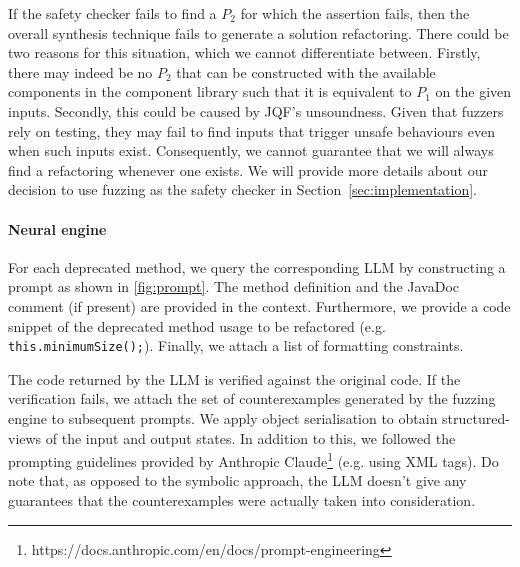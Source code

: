 \documentclass[sigconf,review,anonymous]{acmart}
\begin{document}
If the safety checker fails to find a $P_2$ for which the assertion fails, then the overall synthesis technique fails to generate a solution refactoring.
There could be two reasons for this situation, which we cannot differentiate between.
Firstly, there may indeed be no $P_2$ that can be constructed with the available components in the component library such that
it is equivalent to $P_1$ on the given inputs. Secondly, this could be caused by JQF's unsoundness.
Given that fuzzers rely on testing, they may fail to find inputs that trigger unsafe behaviours even when such inputs exist.
Consequently, we cannot guarantee that we will always find a refactoring whenever one exists. We will provide more details about our decision to use fuzzing as the safety checker in 
Section~\ref{sec:implementation}.


\paragraph{Neural engine}
For each deprecated method, we query the corresponding LLM by constructing a prompt as shown in \autoref{fig:prompt}. The method
definition and the JavaDoc comment (if present) are provided in the context. Furthermore, we
provide a code snippet of the deprecated method usage to be refactored
(e.g. \lstinline{this.minimumSize();}). Finally, we attach a list of formatting constraints.

The code returned by the LLM is verified against the original code. 
If the verification fails, we attach the set of counterexamples generated by the fuzzing
engine to subsequent prompts. We apply object serialisation to obtain structured-views of the input and output states.
In addition to this, we followed the prompting guidelines provided by Anthropic Claude\footnote{https://docs.anthropic.com/en/docs/prompt-engineering} (e.g. using XML tags).
Do note that, as opposed to the symbolic approach, the LLM doesn't give any guarantees that the counterexamples were actually taken into consideration.
\end{document}
